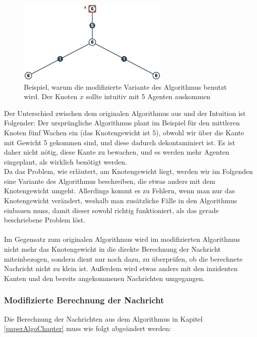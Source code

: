 		\begin{figure}[htb]
			\includegraphics[width=0.65\textwidth]{bilder/abb_paper_problem.png}
			\captionsetup{width=0.65\textwidth}
			\caption{Beispiel, warum die modifizierte Variante des Algorithmus benutzt wird. Der Knoten $x$ sollte intuitiv mit 5 Agenten auskommen}
			\label{fig:negBeispielPaperAlgo}
		\end{figure}

Der Unterschied zwischen dem originalen Algorithmus aus \cite{cima_paper} und der Intuition ist Folgender: Der ursprüngliche Algorithmus plant im Beispiel für den mittleren Knoten fünf Wachen ein (das Knotengewicht ist 5), obwohl wir über die Kante mit Gewicht 5 gekommen sind, und diese dadurch dekontaminiert ist. Es ist daher nicht nötig, diese Kante zu bewachen, und es werden mehr Agenten eingeplant, als wirklich benötigt werden.
\\
Da das Problem, wie erläutert, am Knotengewicht liegt, werden wir im Folgenden eine Variante des Algorithmus beschreiben, die etwas anders mit dem Knotengewicht umgeht. Allerdings kommt es zu Fehlern, wenn man nur das Knotengewicht verändert, weshalb man zusätzliche Fälle in den Algorithmus einbauen muss, damit dieser sowohl richtig funktioniert, als das gerade beschriebene Problem löst.
\\
\\
Im Gegensatz zum originalen Algorithmus \cite{cima_paper} wird im modifizierten Algorithmus nicht mehr das Knotengewicht in die direkte Berechnung der Nachricht miteinbezogen, sondern dient nur noch dazu, zu überprüfen, ob die berechnete Nachricht nicht zu klein ist. Außerdem wird etwas anders mit den inzidenten Kanten und den bereits angekommenen Nachrichten umgegangen.

\subsubsection{Modifizierte Berechnung der Nachricht}

Die Berechnung der Nachrichten aus dem Algorithmus in Kapitel \ref{paperAlgoChapter} muss wie folgt abgeändert werden:

